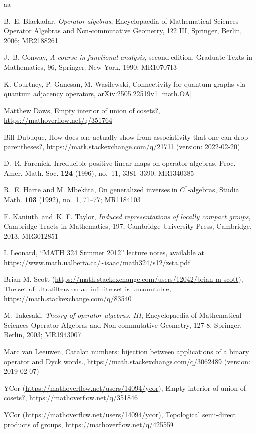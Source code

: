 \documentclass[twoside,a4paper,12pt]{article}
\theoremstyle{plain}
\theoremstyle{definition}
\begin{document}
\begin{thebibliography}{aa}

 B.~E. Blackadar, {\it Operator algebras}, Encyclopaedia of Mathematical Sciences Operator Algebras and Non-commutative Geometry, 122 III, Springer, Berlin, 2006; MR2188261

 J.~B. Conway, {\it A course in functional analysis}, second edition, 
Graduate Texts in Mathematics, 96, Springer, New York, 1990; MR1070713

 K. Courtney, P. Ganesan, M. Wasilewski, Connectivity for quantum graphs via quantum adjacency operators, arXiv:2505.22519v1 [math.OA]

 Matthew Daws, Empty interior of union of cosets?, 
   \url{https://mathoverflow.net/q/351764}

 Bill Dubuque, How does one actually show from associativity that one can drop parentheses?, \url{https://math.stackexchange.com/q/21711} (version: 2022-02-20)

 D.~R. Farenick, Irreducible positive linear maps on operator algebras, Proc. Amer. Math. Soc. {\bf 124} (1996), no.~11, 3381--3390; MR1340385

 R.~E. Harte and M. Mbekhta, On generalized inverses in $C^*$-algebras, Studia Math. {\bf 103} (1992), no.~1, 71--77; MR1184103

 E. Kaniuth\ and\ K. F. Taylor, {\it Induced representations of locally compact groups}, Cambridge Tracts in Mathematics, 197, Cambridge University Press, Cambridge, 2013. MR3012851

 I. Leonard, ``MATH 324 Summer 2012'' lecture notes, available at \url{https://www.math.ualberta.ca/~isaac/math324/s12/zeta.pdf}

 Brian M. Scott (\url{https://math.stackexchange.com/users/12042/brian-m-scott}), The set of ultrafilters on an infinite set is uncountable, \url{https://math.stackexchange.com/q/83540}

 M. Takesaki, {\it Theory of operator algebras. III}, Encyclopaedia of Mathematical Sciences Operator Algebras and Non-commutative Geometry, 127 8, Springer, Berlin, 2003; MR1943007

 Marc van Leeuwen, Catalan numbers: bijection between applications of a binary operator and Dyck words., \url{https://math.stackexchange.com/q/3062489} (version: 2019-02-07)

 YCor (\url{https://mathoverflow.net/users/14094/ycor}), Empty interior of union of cosets?,
   \url{https://mathoverflow.net/q/351846}

 YCor (\url{https://mathoverflow.net/users/14094/ycor}), Topological semi-direct products of groups,
   \url{https://mathoverflow.net/q/425559}

\end{thebibliography}
\end{document}
